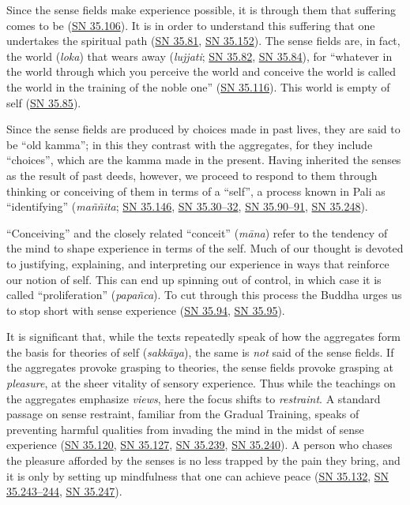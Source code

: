 \documentclass[12pt,openany]{book}%
\begin{document}
Since the sense fields make experience possible, it is through them that suffering comes to be (\href{https://suttacentral.net/sn35.106}{SN 35.106}). It is in order to understand this suffering that one undertakes the spiritual path (\href{https://suttacentral.net/sn35.81}{SN 35.81}, \href{https://suttacentral.net/sn35.152}{SN 35.152}). The sense fields are, in fact, the world (\textit{loka}) that wears away (\textit{lujjati}; \href{https://suttacentral.net/sn35.82}{SN 35.82}, \href{https://suttacentral.net/sn35.84}{SN 35.84}), for “whatever in the world through which you perceive the world and conceive the world is called the world in the training of the noble one” (\href{https://suttacentral.net/sn35.116}{SN 35.116}). This world is empty of self (\href{https://suttacentral.net/sn35.85}{SN 35.85}).

Since the sense fields are produced by choices made in past lives, they are said to be “old kamma”; in this they contrast with the aggregates, for they include “choices”, which are the kamma made in the present. Having inherited the senses as the result of past deeds, however, we proceed to respond to them through thinking or conceiving of them in terms of a “self”, a process known in Pali as “identifying” (\textit{\textsanskrit{maññita}}; \href{https://suttacentral.net/sn35.146}{SN 35.146}, \href{https://suttacentral.net/sn35.30}{SN 35.30–32}, \href{https://suttacentral.net/sn35.90}{SN 35.90–91}, \href{https://suttacentral.net/sn35.248}{SN 35.248}).

“Conceiving” and the closely related “conceit” (\textit{\textsanskrit{māna}}) refer to the tendency of the mind to shape experience in terms of the self. Much of our thought is devoted to justifying, explaining, and interpreting our experience in ways that reinforce our notion of self. This can end up spinning out of control, in which case it is called “proliferation” (\textit{\textsanskrit{papañca}}). To cut through this process the Buddha urges us to stop short with sense experience (\href{https://suttacentral.net/sn35.94}{SN 35.94}, \href{https://suttacentral.net/sn35.95}{SN 35.95}).

It is significant that, while the texts repeatedly speak of how the aggregates form the basis for theories of self (\textit{\textsanskrit{sakkāya}}), the same is \emph{not} said of the sense fields. If the aggregates provoke grasping to theories, the sense fields provoke grasping at \emph{pleasure}, at the sheer vitality of sensory experience. Thus while the teachings on the aggregates emphasize \emph{views}, here the focus shifts to \emph{restraint}. A standard passage on sense restraint, familiar from the Gradual Training, speaks of preventing harmful qualities from invading the mind in the midst of sense experience (\href{https://suttacentral.net/sn35.120}{SN 35.120}, \href{https://suttacentral.net/sn35.127}{SN 35.127}, \href{https://suttacentral.net/sn35.239}{SN 35.239}, \href{https://suttacentral.net/sn35.240}{SN 35.240}). A person who chases the pleasure afforded by the senses is no less trapped by the pain they bring, and it is only by setting up mindfulness that one can achieve peace (\href{https://suttacentral.net/sn35.132}{SN 35.132}, \href{https://suttacentral.net/sn35.243}{SN 35.243–244}, \href{https://suttacentral.net/sn35.247}{SN 35.247}).
\end{document}
